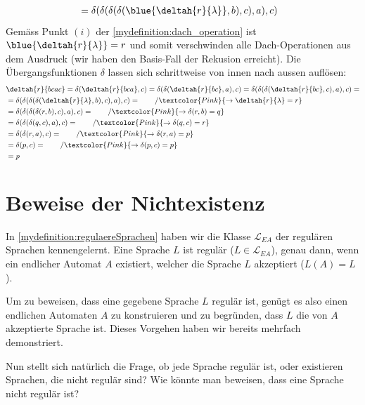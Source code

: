 \begin{myexample}
\begin{align*}
	 & = \delta(\delta(\delta(\delta(\blue{\deltah{r}{\lambda}},b),c),a),c)
\end{align*}
Gemäss Punkt $(i)$ der \cref{mydefinition:dach_operation} ist $\blue{\deltah{r}{\lambda}} = r$  und somit verschwinden alle Dach-Operationen aus dem Ausdruck (wir haben den Basis-Fall der Rekusion erreicht). Die Übergangsfunktionen $\delta$ lassen sich schrittweise von innen nach aussen auflösen:
\begin{align*}
	 & \deltah{r}{bcac} = \delta(\deltah{r}{bca},c) = \delta(\delta(\deltah{r}{bc},a),c) = \delta(\delta(\delta(\deltah{r}{bc},c),a),c) = \\
	 & = \delta(\delta(\delta(\delta(\deltah{r}{\lambda},b),c),a),c) = \quad\quad / \textcolor{Pink}{\to \deltah{r}{\lambda} = r}         \\
	 & = \delta(\delta(\delta(\delta(r,b),c),a),c) = \quad\quad / \textcolor{Pink}{\to \delta(r,b) = q}                                   \\
	 & = \delta(\delta(\delta(q,c),a),c) = \quad\quad / \textcolor{Pink}{\to \delta(q,c) = r}                                             \\
	 & = \delta(\delta(r,a),c) = \quad\quad / \textcolor{Pink}{\to \delta(r,a) = p}                                                       \\
	 & = \delta(p,c) = \quad\quad / \textcolor{Pink}{\to \delta(p,c) = p}                                                                 \\
	 & = p
\end{align*}
\end{myexample}

\section{Beweise der Nichtexistenz}
In \cref{mydefinition:regulaereSprachen} haben wir die Klasse $\mathcal{L}_{EA}$ der regulären Sprachen kennengelernt. Eine Sprache $L$ ist regulär ($L\in\mathcal{L}_{EA}$), genau dann, wenn ein endlicher Automat $A$ existiert, welcher die Sprache $L$ akzeptiert ($L(A) = L$).

Um zu beweisen, dass eine gegebene Sprache $L$ regulär ist, genügt es also einen endlichen Automaten $A$ zu konstruieren und zu begründen, dass $L$ die von $A$ akzeptierte Sprache ist. Dieses Vorgehen haben wir bereits mehrfach demonstriert.

Nun stellt sich natürlich die Frage, ob jede Sprache regulär ist, oder existieren Sprachen, die nicht regulär sind? Wie könnte man beweisen, dass eine Sprache nicht regulär ist?

